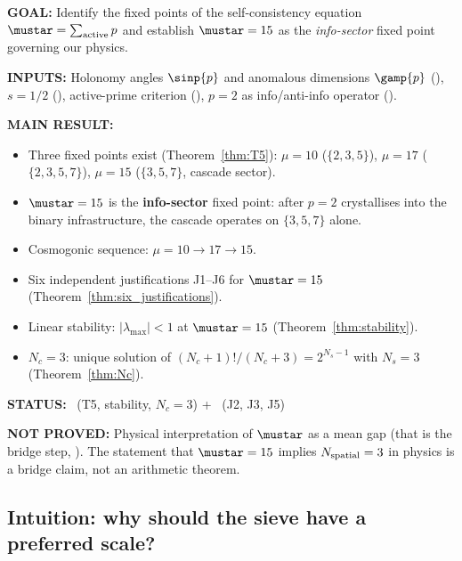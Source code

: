 \documentclass[12pt,a4paper]{article}
\begin{document}
\begin{statusbox}
\textbf{GOAL:}
  Identify the fixed points of the self-consistency equation
  $\mustar = \sum_{\text{active}} p$ and establish $\mustar = 15$
  as the \emph{info-sector} fixed point governing our physics.

\textbf{INPUTS:}
  Holonomy angles $\sinp{p}$ and anomalous dimensions $\gamp{p}$
  (\cite{companion_M2}), $s = 1/2$ (\cite{companion_M1}),
  active-prime criterion (\cite{companion_M2}),
  $p = 2$ as info/anti-info operator (\cite{companion_M1}).

\textbf{MAIN RESULT:}
  \begin{itemize}[nosep]
  \item Three fixed points exist (Theorem~\ref{thm:T5}):
    $\mu = 10$ ($\{2,3,5\}$), $\mu = 17$ ($\{2,3,5,7\}$),
    $\mu = 15$ ($\{3,5,7\}$, cascade sector).
  \item $\mustar = 15$ is the \textbf{info-sector} fixed point:
    after $p = 2$ crystallises into the binary infrastructure,
    the cascade operates on $\{3,5,7\}$ alone.
  \item Cosmogonic sequence: $\mu = 10 \to 17 \to 15$.
  \item Six independent justifications J1--J6 for $\mustar = 15$
    (Theorem~\ref{thm:six_justifications}).
  \item Linear stability: $|\lambda_{\max}| < 1$ at $\mustar = 15$
    (Theorem~\ref{thm:stability}).
  \item $N_c = 3$: unique solution of $(N_c + 1)!/(N_c + 3) = 2^{N_s - 1}$
    with $N_s = 3$ (Theorem~\ref{thm:Nc}).
  \end{itemize}

\textbf{STATUS:}
  \THMTAG~(T5, stability, $N_c = 3$) + \BRIDGETAG~(J2, J3, J5)

\textbf{NOT PROVED:}
  Physical interpretation of $\mustar$ as a mean gap (that is the
  bridge step, \cite{companion_M5}). The statement that $\mustar = 15$ implies
  $N_{\rm spatial} = 3$ in physics is a bridge claim, not an
  arithmetic theorem.
\end{statusbox}

\subsection{Intuition: why should the sieve have a preferred scale?}
\label{sec:ch8_intuition}
\end{document}
